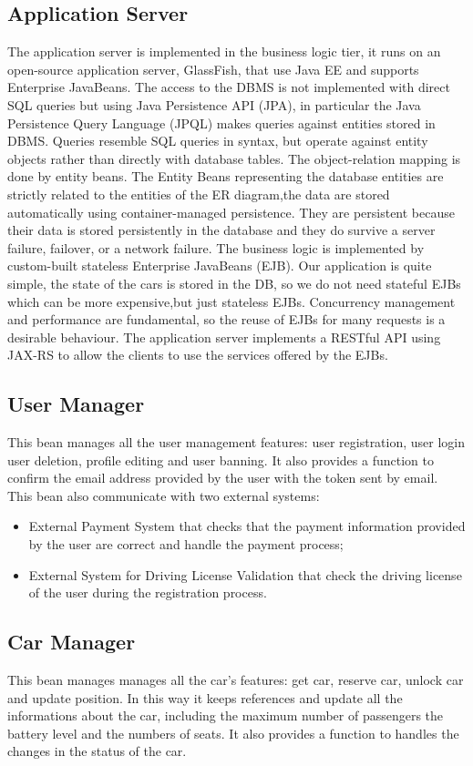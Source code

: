 \subsection{Application Server}
The application server is implemented in the business logic tier, it runs on an open-source application server, GlassFish, that use Java EE and supports Enterprise JavaBeans.
The access to the DBMS is not implemented with direct SQL queries but using Java Persistence API (JPA), in particular the Java Persistence Query Language (JPQL) makes queries against entities stored in DBMS.
Queries resemble SQL queries in syntax, but operate against entity objects rather than directly with database tables.
The object-relation mapping is done by entity beans.
The Entity Beans representing the database entities are strictly related to the entities of the ER diagram,the data  are stored automatically using container-managed persistence.
They are persistent because their data is stored persistently in the database and they do survive a server failure, failover, or a network failure.
The business logic is implemented by custom-built stateless Enterprise JavaBeans (EJB).
Our application is quite simple, the state of the cars is stored in the DB, so we do not need stateful EJBs which can be more expensive,but just stateless EJBs.
Concurrency management and performance are fundamental, so the reuse of EJBs for many requests is a desirable behaviour.
The application server implements a RESTful API using JAX-RS to allow the clients to use the services offered by the EJBs.

\subsection{User Manager}
This bean manages all the user management features: user registration, user login user deletion, profile editing and user banning.
It also provides a function to confirm the email address provided by the user with the token sent by email.
This bean also communicate with two external systems:
\begin{itemize}
\item External Payment System that checks that the payment information provided by the user are correct and handle the payment process;
\item External System for Driving License Validation that check the driving license of the user during the registration process.
\end{itemize}

\subsection{Car Manager}
This bean manages manages all the car's features: get car, reserve car, unlock car and update position.
In this way it keeps references and update all the informations about the car, including the maximum number of passengers the battery level and the numbers of seats.
It also provides a function to handles the changes in the status of the car.

